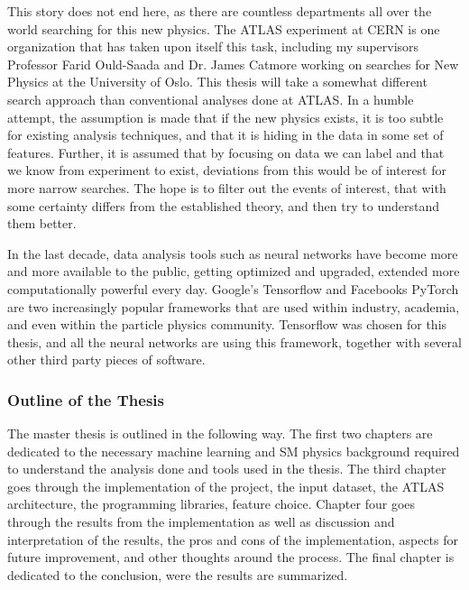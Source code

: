 This story does not end here, as there are countless departments all 
over the world searching for this new physics. The ATLAS experiment at CERN is one organization that 
has taken upon itself this task, including my supervisors Professor Farid Ould-Saada and 
Dr. James Catmore working on searches for New Physics at the University of Oslo. This thesis will take a somewhat different search 
approach than conventional analyses done at ATLAS. In a humble attempt, the assumption is made that 
if the new physics exists, it is too subtle for existing analysis techniques, and that it is hiding in the data
in some set of features. Further, it is assumed that by focusing on data we can label and that we know 
from experiment to exist, deviations from this would be of interest for more narrow searches. The hope is 
to filter out the events of interest, that with some certainty differs from the established theory, 
and then try to understand them better. \par 
In the last decade, data analysis tools such as neural networks have become more and more available 
to the public, getting optimized and upgraded, extended more computationally powerful every 
day. Google's Tensorflow\cite{tensorflow-whitepaper} and Facebooks PyTorch\cite{paszkepytorch} 
are two increasingly popular frameworks that are used within industry, 
academia, and even within the particle physics community. Tensorflow was chosen for this thesis, and 
all the neural networks are using this framework, together with several other third party pieces of software. \par 

\subsubsection*{Outline of the Thesis}
The master thesis is outlined in the following way. The first two chapters are dedicated to the necessary machine learning and
SM physics background required to understand the analysis done and tools used in the thesis. The third chapter goes 
through the implementation of the project, the input dataset, the ATLAS architecture, the programming libraries, 
feature choice. Chapter four goes through the results from the implementation as well as discussion and 
interpretation of the results, the pros and cons of the implementation, aspects for future improvement, and other thoughts around the process.
The final chapter is dedicated to the conclusion, were the results are summarized. 


